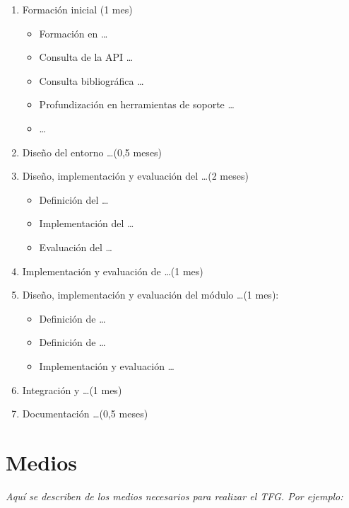 \begin{enumerate}
  
\item Formación inicial (1 mes)
  
  \begin{itemize}
  \item Formación en \ldots
  \item Consulta de la API \ldots
  \item Consulta bibliográfica \ldots
  \item Profundización en herramientas de soporte \ldots
  \item  \ldots
  \end{itemize}

\item Diseño del entorno \ldots (0,5 meses)

\item Diseño, implementación y evaluación del  \ldots (2 meses)
  \begin{itemize}
  \item Definición del  \ldots
  \item Implementación del  \ldots
  \item Evaluación del  \ldots
  \end{itemize}
  
\item Implementación y evaluación de  \ldots (1 mes)

\item Diseño, implementación y evaluación del módulo  \ldots (1 mes):
  \begin{itemize}
  \item Definición de  \ldots
  \item Definición de  \ldots
  \item Implementación y evaluación  \ldots
  \end{itemize}

\item Integración y  \ldots (1 mes)

\item Documentación  \ldots (0,5 meses)

\end{enumerate}


\section{Medios}
\label{sec:medios}

\textit{Aquí se describen de los medios necesarios para realizar el TFG. Por
  ejemplo:}


